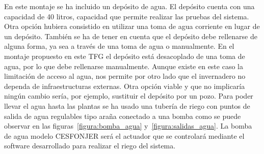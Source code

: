 \documentclass[a4paper, 12pt, oneside]{book}
\begin{document}
En este montaje se ha incluido un depósito de agua. El depósito cuenta con una capacidad de 40 litros, capacidad que permite realizar las pruebas del sistema.  
Otra opción hubiera consistido en utilizar una toma de agua corriente en lugar de un depósito. También se ha de tener en cuenta que el depósito debe rellenarse de alguna forma, ya sea a través de una toma de agua o manualmente. En el montaje propuesto en este TFG el depósito está desacoplado de una toma de agua, por lo que debe rellenarse manualmente.  Aunque existe en este caso la limitación de acceso al agua, nos permite por otro lado que el invernadero no dependa de infraestructuras externas. Otra opción viable y que no implicaría ningún cambio sería, por ejemplo, sustituir el depósito por un pozo. Para poder llevar el agua hasta las plantas se ha usado una tubería de riego con puntos de salida de agua regulables tipo araña conectado a una bomba como se puede observar en las figuras~\ref{figura:bomba_agua} y~\ref{figura:salidas_agua}. La bomba de agua modelo CESFONJER será el actuador que se controlará mediante el software desarrollado para realizar el riego del sistema.
\end{document}
